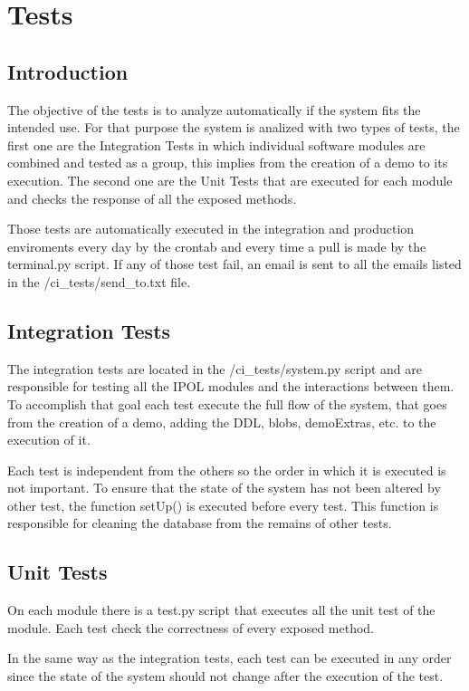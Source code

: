 \section{Tests}
\label{sec:Tests}
\subsection{Introduction}

The objective of the tests is to analyze automatically if the system fits the intended use. For that purpose the system is analized with two
types of tests, the first one are the Integration Tests in which individual software modules are combined and tested as a group, this implies from
the creation of a demo to its execution. The second one are the Unit Tests that are executed for each module and checks the response of all the
exposed methods.

Those tests are automatically executed in the integration and production enviroments every day by the crontab and every time a pull is made by 
the terminal.py script. If any of those test fail, an email is sent to all the emails listed in the /ci\_tests/send\_to.txt file.


\subsection{Integration Tests}

The integration tests are located in the /ci\_tests/system.py script and are responsible for testing all the IPOL modules and the interactions
between them. To accomplish that goal each test execute the full flow of the system, that goes from the creation of a demo, adding the DDL, blobs,
demoExtras, etc. to the execution of it.

Each test is independent from the others so the order in which it is executed is not important. To ensure that the state of the system has not been
altered by other test, the function setUp() is executed before every test. This function is responsible for cleaning the database from the 
remains of other tests.

\subsection{Unit Tests}

On each module there is a test.py script that executes all the unit test of the module. Each test check the correctness of every exposed method.

In the same way as the integration tests, each test can be executed in any order since the state of the system should not change after the execution
of the test.


